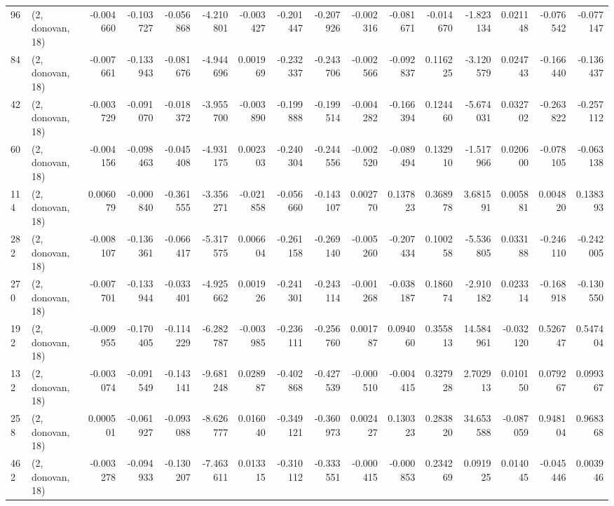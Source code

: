 \begin{tabular}{llrrrrrrrrrrrrrr}
96  &  (2, donovan, 18) &  -0.004660 & -0.103727 & -0.056868 &   -4.210801 & -0.003427 &  -0.201447 & -0.207926 & -0.002316 & -0.081671 & -0.014670 &   -1.823134 &  0.021148 & -0.076542 & -0.077147 \\
84  &  (2, donovan, 18) &  -0.007661 & -0.133943 & -0.081676 &   -4.944696 &  0.001969 &  -0.232337 & -0.243706 & -0.002566 & -0.092837 &  0.116225 &   -3.120579 &  0.024743 & -0.166440 & -0.136437 \\
42  &  (2, donovan, 18) &  -0.003729 & -0.091070 & -0.018372 &   -3.955700 & -0.003890 &  -0.199888 & -0.199514 & -0.004282 & -0.166394 &  0.124460 &   -5.674031 &  0.032702 & -0.263822 & -0.257112 \\
60  &  (2, donovan, 18) &  -0.004156 & -0.098463 & -0.045408 &   -4.931175 &  0.002303 &  -0.240304 & -0.244556 & -0.002520 & -0.089494 &  0.132910 &   -1.517966 &  0.020600 & -0.078105 & -0.063138 \\
114 &  (2, donovan, 18) &   0.006079 & -0.000840 & -0.361555 &   -3.356271 & -0.021858 &  -0.056660 & -0.143107 &  0.002770 &  0.137823 &  0.368978 &    3.681591 &  0.005881 &  0.004820 &  0.138393 \\
282 &  (2, donovan, 18) &  -0.008107 & -0.136361 & -0.066417 &   -5.317575 &  0.006604 &  -0.261158 & -0.269140 & -0.005260 & -0.207434 &  0.100258 &   -5.536805 &  0.033188 & -0.246110 & -0.242005 \\
270 &  (2, donovan, 18) &  -0.007701 & -0.133944 & -0.033401 &   -4.925662 &  0.001926 &  -0.241301 & -0.243114 & -0.001268 & -0.038187 &  0.186074 &   -2.910182 &  0.023314 & -0.168918 & -0.130550 \\
192 &  (2, donovan, 18) &  -0.009955 & -0.170405 & -0.114229 &   -6.282787 & -0.003985 &  -0.236111 & -0.256760 &  0.001787 &  0.094060 &  0.355813 &   14.584961 & -0.032120 &  0.526747 &  0.547404 \\
132 &  (2, donovan, 18) &  -0.003074 & -0.091549 & -0.143141 &   -9.681248 &  0.028987 &  -0.402868 & -0.427539 & -0.000510 & -0.004415 &  0.327928 &    2.702913 &  0.010150 &  0.079267 &  0.099367 \\
258 &  (2, donovan, 18) &   0.000501 & -0.061927 & -0.093088 &   -8.626777 &  0.016040 &  -0.349121 & -0.360973 &  0.002427 &  0.130323 &  0.283820 &   34.653588 & -0.087059 &  0.948104 &  0.968368 \\
462 &  (2, donovan, 18) &  -0.003278 & -0.094933 & -0.130207 &   -7.463611 &  0.013315 &  -0.310112 & -0.333551 & -0.000415 & -0.000853 &  0.234269 &    0.091925 &  0.014045 & -0.045446 &  0.003946 \\

\end{tabular}
